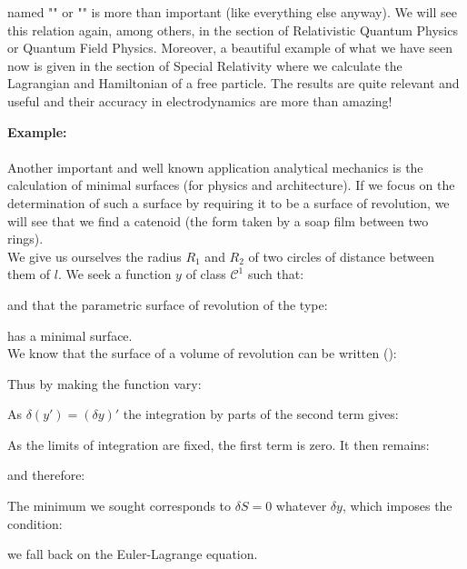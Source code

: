	named "" or "" is more than important (like everything else anyway). We will see this relation again, among others, in the section of Relativistic Quantum Physics or Quantum Field Physics. Moreover, a beautiful example of what we have seen now is given in the section of Special Relativity where we calculate the Lagrangian and Hamiltonian of a free particle. The results are quite relevant and useful and their accuracy in electrodynamics are more than amazing!
	\begin{tcolorbox}[colframe=black,colback=white,sharp corners]
	\textbf{{\Large {}}Example:}\\\\
	Another important and well known application analytical mechanics is the calculation of minimal surfaces (for physics and architecture). If we focus on the determination of such a surface by requiring it to be a surface of revolution, we will see that we find a catenoid (the form taken by a soap film between two rings).\\
	
	We give us ourselves the radius $R_1$ and $R_2$ of two circles of distance between them of $l$. We seek a function $y$ of class $\mathcal{C}^1$ such that:
	
	and that the parametric surface of revolution of the type:
	
	has a minimal surface.\\
	
	We know that the surface of a volume of revolution can be written ():
	
	Thus by making the function vary:
	
	As $\delta (y')=(\delta y)'$ the integration by parts of the second term gives:
	
	As the limits of integration are fixed, the first term is zero. It then remains:
	
	and therefore:
	
	The minimum we sought corresponds to  $\delta S=0$ whatever $\delta y$, which imposes the condition:
	
	we fall back on the Euler-Lagrange equation.
	\end{tcolorbox}
	
